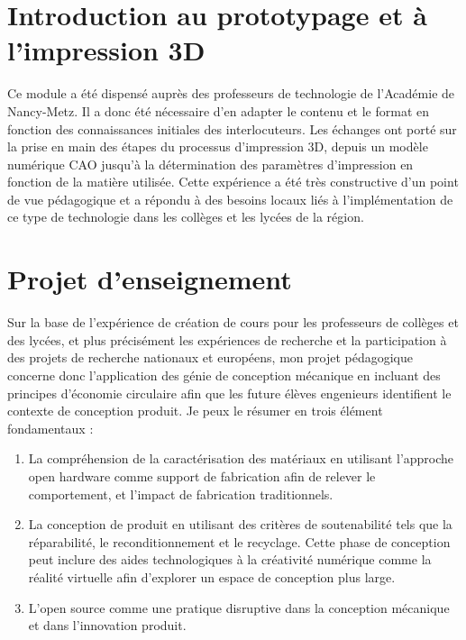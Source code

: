 \documentclass[
  12pt,
  oneside]{book}
\providecommand{\tightlist}{%
  \setlength{\itemsep}{0pt}\setlength{\parskip}{0pt}}
\begin{document}
\hypertarget{introduction-au-prototypage-et-uxe0-limpression-3d}{%
\section{Introduction au prototypage et à l'impression 3D}\label{introduction-au-prototypage-et-uxe0-limpression-3d}}

Ce module a été dispensé auprès des professeurs de technologie de l'Académie de Nancy-Metz. Il a donc été nécessaire d'en adapter le contenu et le format en fonction des connaissances initiales des interlocuteurs. Les échanges ont porté sur la prise en main des étapes du processus d'impression 3D, depuis un modèle numérique CAO jusqu'à la détermination des paramètres d'impression en fonction de la matière utilisée.
Cette expérience a été très constructive d'un point de vue pédagogique et a répondu à des besoins locaux liés à l'implémentation de ce type de technologie dans les collèges et les lycées de la région.

\hypertarget{projet-denseignement}{%
\section{Projet d'enseignement}\label{projet-denseignement}}

Sur la base de l'expérience de création de cours pour les professeurs de collèges et des lycées, et plus précisément les expériences de recherche et la participation à des projets de recherche nationaux et européens, mon projet pédagogique concerne donc l'application des génie de conception mécanique en incluant des principes d'économie circulaire afin que les future élèves engenieurs identifient le contexte de conception produit. Je peux le résumer en trois élément fondamentaux :

\begin{enumerate}
\def\labelenumi{\arabic{enumi}.}
\tightlist
\item
  La compréhension de la caractérisation des matériaux en utilisant l'approche open hardware comme support de fabrication afin de relever le comportement, et l'impact de fabrication traditionnels.
\item
  La conception de produit en utilisant des critères de soutenabilité tels que la réparabilité, le reconditionnement et le recyclage. Cette phase de conception peut inclure des aides technologiques à la créativité numérique comme la réalité virtuelle afin d'explorer un espace de conception plus large.
\item
  L'open source comme une pratique disruptive dans la conception mécanique et dans l'innovation produit.
\end{enumerate}
\end{document}
